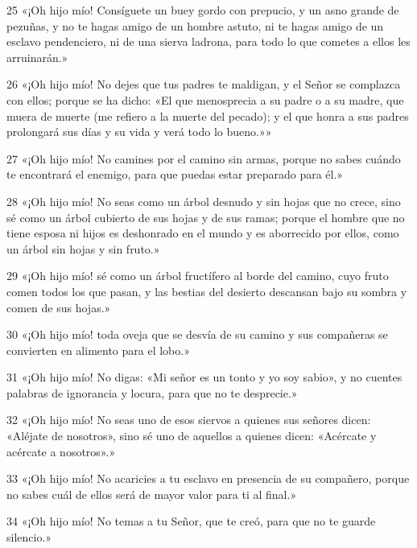 \par 25 «¡Oh hijo mío! Consíguete un buey gordo con prepucio, y un asno grande de pezuñas, y no te hagas amigo de un hombre astuto, ni te hagas amigo de un esclavo pendenciero, ni de una sierva ladrona, para todo lo que cometes a ellos les arruinarán.»

\par 26 «¡Oh hijo mío! No dejes que tus padres te maldigan, y el Señor se complazca con ellos; porque se ha dicho: «El que menosprecia a su padre o a su madre, que muera de muerte (me refiero a la muerte del pecado); y el que honra a sus padres prolongará sus días y su vida y verá todo lo bueno.»»

\par 27 «¡Oh hijo mío! No camines por el camino sin armas, porque no sabes cuándo te encontrará el enemigo, para que puedas estar preparado para él.»

\par 28 «¡Oh hijo mío! No seas como un árbol desnudo y sin hojas que no crece, sino sé como un árbol cubierto de sus hojas y de sus ramas; porque el hombre que no tiene esposa ni hijos es deshonrado en el mundo y es aborrecido por ellos, como un árbol sin hojas y sin fruto.»

\par 29 «¡Oh hijo mío! sé como un árbol fructífero al borde del camino, cuyo fruto comen todos los que pasan, y las bestias del desierto descansan bajo su sombra y comen de sus hojas.»

\par 30 «¡Oh hijo mío! toda oveja que se desvía de su camino y sus compañeras se convierten en alimento para el lobo.»

\par 31 «¡Oh hijo mío! No digas: «Mi señor es un tonto y yo soy sabio», y no cuentes palabras de ignorancia y locura, para que no te desprecie.»

\par 32 «¡Oh hijo mío! No seas uno de esos siervos a quienes sus señores dicen: «Aléjate de nosotros», sino sé uno de aquellos a quienes dicen: «Acércate y acércate a nosotros».»

\par 33 «¡Oh hijo mío! No acaricies a tu esclavo en presencia de su compañero, porque no sabes cuál de ellos será de mayor valor para ti al final.»

\par 34 «¡Oh hijo mío! No temas a tu Señor, que te creó, para que no te guarde silencio.»

